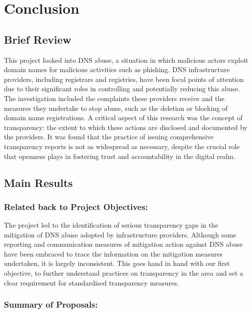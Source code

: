 \chapter{Conclusion}

\section{Brief Review}

This project looked into DNS abuse, a situation in which malicious actors exploit domain names for malicious activities such as phishing. DNS infrastructure providers, including registrars and registries, have been focal points of attention due to their significant roles in controlling and potentially reducing this abuse. The investigation included the complaints these providers receive and the measures they undertake to stop abuse, such as the deletion or blocking of domain name registrations. A critical aspect of this research was the concept of transparency: the extent to which these actions are disclosed and documented by the providers. It was found that the practice of issuing comprehensive transparency reports is not as widespread as necessary, despite the crucial role that openness plays in fostering trust and accountability in the digital realm. 


\section{Main Results}

\subsection{Related back to Project Objectives:}

The project led to the identification of serious transparency gaps in the mitigation of DNS abuse adopted by infrastructure providers. Although some reporting and communication measures of mitigation action against DNS abuse have been embraced to trace the information on the mitigation measures undertaken, it is largely inconsistent. This goes hand in hand with our first objective, to further understand practices on transparency in the area and set a clear requirement for standardised transparency measures.

\subsection{Summary of Proposals:}

